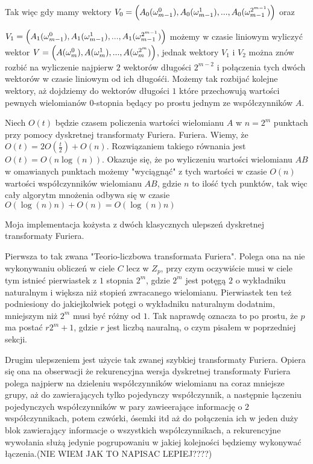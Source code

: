 \documentclass{article}
\begin{document}
Tak więc gdy mamy wektory $V_0=\Bigl( A_0(\omega_{m-1}^0),A_0(\omega_{m-1}^1),...,A_0(\omega_{m-1}^{2^{m-1}})\Bigr)$ oraz                          

$V_1=\Bigl( A_1(\omega_{m-1}^0),A_1(\omega_{m-1}^1),...,A_1(\omega_{m-1}^{2^{m-1}})\Bigr)$ możemy
w czasie liniowym wyliczyć wektor $V=\Bigl( A(\omega_{m}^0),A(\omega_{m}^1),...,A(\omega_{m}^{2^{m}})\Bigr)$, jednak wektory 
$V_1$ i $V_2$ można znów rozbić na wyliczenie najpierw $2$ wektorów długości $2^{m-2}$ i 
połączenia tych dwóch wektorów w czasie liniowym od ich długośći. Możemy tak rozbijać kolejne wektory, aż dojdziemy do wektorów długości
$1$ które przechowują wartości pewnych wielomianów $0$-stopnia będący po prostu jednym ze współczynników $A$.

Niech $O(t)$ będzie czasem policzenia wartości wielomianu $A$ w $n=2^m$ punktach przy pomocy dyskretnej transformaty Furiera. 
Furiera. Wiemy, że $O(t)=2O(\frac{t}{2})+O(n)$. Rozwiązaniem takiego równania jest $O(t)=O(n\log(n))$.
Okazuje się, że po wyliczeniu wartości wielomianu $AB$ w omawianych punktach możemy "wyciągnąć" z tych wartości w czasie
$O(n)$ wartości współczynników wielomianu $AB$, gdzie $n$ to ilość tych punktów, tak więc cały algorytm mnożenia odbywa się w czasie $O(\log(n)n)+O(n)=O(\log(n)n)$

Moja implementacja kożysta z dwóch klasycznych ulepszeń dyskretnej transformaty Furiera. 

Pierwsza to tak zwana "Teorio-liczbowa transformata Furiera". Polega ona na nie wykonywaniu obliczeń w ciele $C$ lecz
w $Z_p$, przy czym oczywiście musi w ciele tym istnieć pierwiastek z $1$ stopnia $2^m$, gdzie $2^m$ jest potęgą $2$ o wykładniku
naturalnym i większa niż stopień zwracanego wielomianu. Pierwiastek ten też podniesiony do jakiejkolwiek potęgi 
o wykładniku naturalnym dodatnim, mniejszym niż $2^m$ musi być różny od $1$. 
Tak naprawdę oznacza to po prostu, że $p$ ma postać $r2^m+1$, gdzie $r$ jest liczbą nauralną, o czym pisałem w poprzedniej 
sekcji.

Drugim ulepszeniem jest użycie tak zwanej szybkiej transformaty Furiera. Opiera się ona na obserwacji że rekurencyjna wersja dyskretnej transformaty Furiera 
polega najpierw na dzieleniu współczynników wielomianu na coraz mniejsze grupy, aż do zawierających tylko pojedynczy współczynnik, a następnie łączeniu pojedynczych współczynników
w pary zawieerające informację o $2$ współczynnikach, potem czwórki, ósemki itd aż do połączenia ich w jeden duży blok zawierający informacje o wszystkich współczynnikach, a rekurencyjne wywołania służą jedynie 
pogrupowaniu w jakiej kolejności będziemy wykonywać łączenia.(NIE WIEM JAK TO NAPISAC LEPIEJ????)
 
\end{document}
